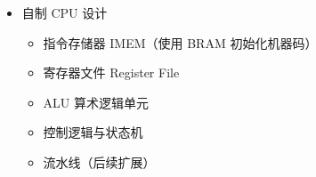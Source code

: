 
\begin{itemize}
    \item[\textbf{[ WIP ]}] 自制 CPU 设计
        \begin{itemize}
            \item 指令存储器 IMEM（使用 BRAM 初始化机器码）
            \item 寄存器文件 Register File
            \item ALU 算术逻辑单元
            \item 控制逻辑与状态机
            \item 流水线（后续扩展）
        \end{itemize}
\end{itemize}
